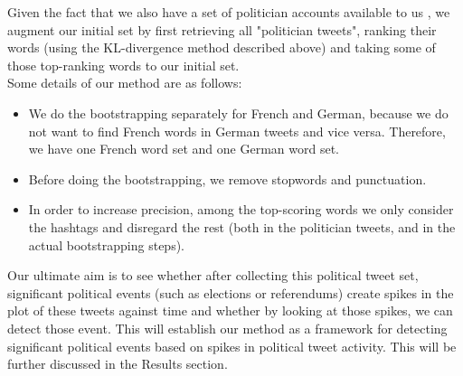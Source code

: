 Given the fact that we also have a set of politician accounts available to us \cite{swiss_political_users}, we augment our initial set by first retrieving all "politician tweets", ranking their words (using the KL-divergence method described above) and taking some of those top-ranking words to our initial set. \\
Some details of our method are as follows:
\begin{itemize}
  \item We do the bootstrapping separately for French and German, because we do not want to find French words in German tweets and vice versa. Therefore, we have one French word set and one German word set.
  \item Before doing the bootstrapping, we remove stopwords and punctuation.
  \item In order to increase precision, among the top-scoring words we only consider the hashtags and disregard the rest (both in the politician tweets, and in the actual bootstrapping steps).
\end{itemize}
Our ultimate aim is to see whether after collecting this political tweet set, significant political events (such as elections or referendums) create spikes in the plot of these tweets against time and whether by looking at those spikes, we can detect those event. This will establish our method as a framework for detecting significant political events based on spikes in political tweet activity. This will be further discussed in the Results section.